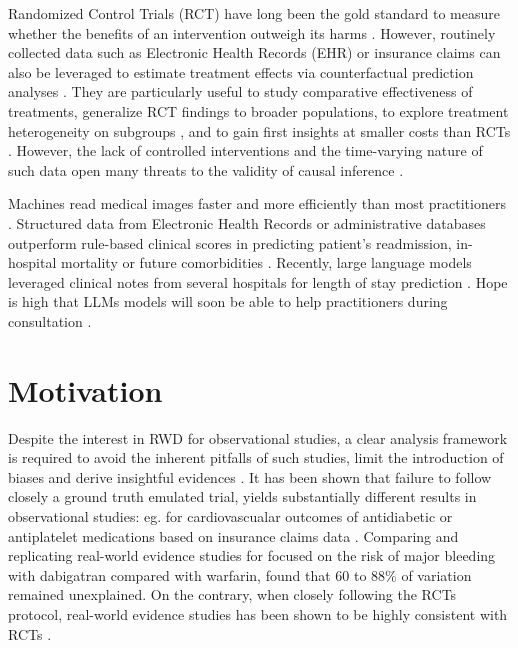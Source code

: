 \documentclass{report}
\begin{document}
Randomized Control Trials (RCT) have
long been the gold standard to measure whether the benefits of an intervention
outweigh its harms \citep{brook1986method}. However, routinely collected data
such as Electronic Health Records (EHR) or insurance claims
\citep{wang2023early} can also be leveraged to estimate treatment effects via
counterfactual prediction analyses \citep{hernan2019second}.  They are
particularly useful to study comparative effectiveness of treatments,
generalize RCT findings to broader populations, to explore treatment
heterogeneity on subgroups \citep{mant1999can,desai2021broadening}, and to
gain first insights at smaller costs than RCTs
\citep{black1996we,bosdriesz2020evidence}. However, the lack of controlled
interventions and the time-varying nature of such data open many threats to
the validity of causal inference \citep{bouvier2023should}.


Machines read medical images faster
and more efficiently than most practitioners \citep{zhou2021review}.
Structured data from Electronic Health Records \citep{rajkomar2018scalable} or
administrative databases \citep{beaulieu2021machine} outperform rule-based
clinical scores in predicting patient's readmission, in-hospital mortality or
future comorbidities \citep{li2020behrt}. Recently, large language models
leveraged clinical notes from several hospitals for length of stay prediction
\citep{jiang2023health}. Hope is high that LLMs models will soon be able to
help practitioners during consultation \citep{lee2023benefits}.


\section{Motivation}

Despite the interest in RWD for observational studies, a clear analysis
framework is required to avoid the inherent pitfalls of such studies, limit the
introduction of biases and derive insightful evidences \citep{hernan2019second,
  wang2023emulation}. It has been shown that failure to follow closely a ground
truth emulated trial,
yields substantially different results in observational studies: eg. for
cardiovascualar outcomes of antidiabetic or antiplatelet medications based on
insurance claims data \citep{schneeweiss2021conducting}. Comparing and
replicating real-world evidence studies for focused on the risk of major
bleeding
with dabigatran compared with warfarin, \cite{wang2022understanding} found that
60 to 88\% of variation remained unexplained. On the contrary, when closely
following the RCTs protocol, real-world evidence studies has been shown to be
highly consistent with RCTs \citep{wang2023emulation}.
\clearpage
\end{document}
